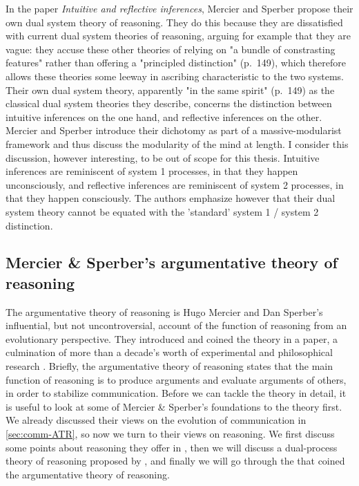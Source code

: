 In the \citeyear{MS09} paper \emph{Intuitive and reflective inferences}, Mercier and Sperber propose their own dual system theory of reasoning. They do this because they are dissatisfied with current dual system theories of reasoning, arguing for example that they are vague: they accuse these other theories of relying on "a bundle of constrasting features" rather than offering a "principled distinction" (p.~149), which therefore allows these theories some leeway in ascribing characteristic to the two systems.
Their own dual system theory, apparently "in the same spirit" (p.~149) as the classical dual system theories they describe, concerns the distinction between intuitive inferences on the one hand, and reflective inferences on the other.
Mercier and Sperber introduce their dichotomy as part of a massive-modularist framework and thus discuss the modularity of the mind at length. I consider this discussion, however interesting, to be out of scope for this thesis.
Intuitive inferences are reminiscent of system 1 processes, in that they happen unconsciously, and reflective inferences are reminiscent of system 2 processes, in that they happen consciously.
The authors emphasize however that their dual system theory cannot be equated with the 'standard' system 1 / system 2 distinction.

\subsection{Mercier \& Sperber's argumentative theory of reasoning}
\label{sec:MS11}

The argumentative theory of reasoning is Hugo Mercier and Dan Sperber's influential, but not uncontroversial, account of the function of reasoning from an evolutionary perspective. They introduced and coined the theory in a \citeyear{MS11} paper, a culmination of more than a decade's worth of experimental and philosophical research \citep{Sperber01, Sperber10, MS09, Sperber00}.
Briefly, the argumentative theory of reasoning states that the main function of reasoning is to produce arguments and evaluate arguments of others, in order to stabilize communication.
Before we can tackle the theory in detail, it is useful to look at some of Mercier \& Sperber's foundations to the theory first. We already discussed their views on the evolution of communication in \cref{sec:comm-ATR}, so now we turn to their views on reasoning. We first discuss some points about reasoning they offer in \citet{Sperber01,Sperber10}, then we will discuss a dual-process theory of reasoning proposed by \citet{MS09}, and finally we will go through the \citeyear{MS11} that coined the argumentative theory of reasoning.

